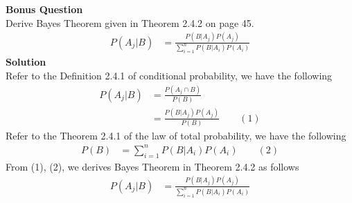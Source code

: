 \documentclass{uofa-eng-assignment}
\begin{document}
\begin{enumerate}
        \textbf{Bonus Question} \\
        Derive Bayes Theorem given in Theorem 2.4.2 on page 45. \\
        \begin{align*}
            P(A_j | B) & = \frac{P(B | A_j) P(A_j)}{\sum_{i=1}^{n} P(B | A_i) P(A_i)}
        \end{align*}
        \textbf{Solution} \\
        Refer to the Definition 2.4.1 of conditional probability, we have the following
        \begin{align*}
            P(A_j | B) & = \frac{P(A_j \cap B)}{P(B)}                \\
                       & = \frac{P(B | A_j) P(A_j)}{P(B)} \qquad (1)
        \end{align*}
        Refer to the Theorem 2.4.1 of the law of total probability, we have the following
        \begin{align*}
            P(B) & = \sum_{i=1}^{n} P(B | A_i) P(A_i) \qquad (2)
        \end{align*}
        From (1), (2), we derives Bayes Theorem in Theorem 2.4.2 as follows
        \begin{align*}
            P(A_j | B) & = \frac{P(B | A_j) P(A_j)}{\sum_{i=1}^{n} P(B | A_i) P(A_i)}
        \end{align*}
\end{enumerate}
\end{document}
